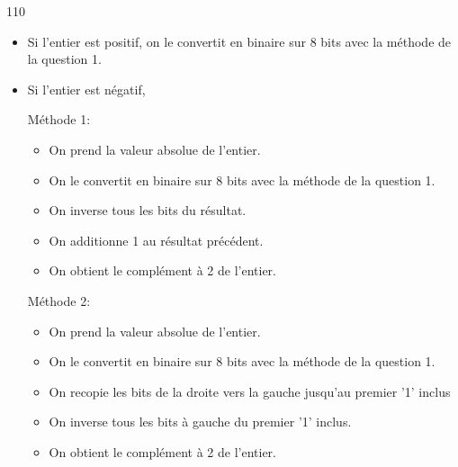 \documentclass[a4paper,10pt]{report}
\begin{document}
\begin{answer}{1}{10}
    \begin{itemize}
    \item Si l'entier est positif, on le convertit en binaire sur 8 bits avec la méthode de la question 1.
    \item Si l'entier est négatif,
    
     Méthode 1:
            \begin{itemize}
                \item On prend la valeur absolue de l'entier.
                \item On le convertit en binaire sur 8 bits avec la méthode de la question 1.
                \item On inverse tous les bits du résultat.
                \item On additionne 1 au résultat précédent.
                \item On obtient le complément à 2 de l'entier.
            \end{itemize}

     Méthode 2:
            \begin{itemize}
                \item On prend la valeur absolue de l'entier.
                \item On le convertit en binaire sur 8 bits avec la méthode de la question 1.
                \item On recopie les bits de la droite vers la gauche jusqu'au premier '1' inclus
                \item On inverse tous les bits à gauche du premier '1' inclus.
                \item On obtient le complément à 2 de l'entier.
            \end{itemize}
    \end{itemize}
    \end{answer}

\medskip
\end{document}
